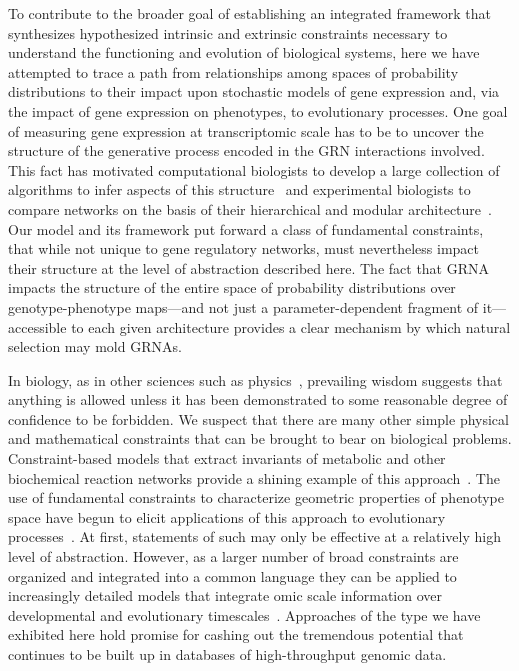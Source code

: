 To contribute to the broader goal of establishing an integrated framework that synthesizes hypothesized intrinsic and extrinsic constraints necessary to understand the functioning and evolution of biological systems, here we have attempted to trace a path from relationships among spaces of probability distributions to their impact upon stochastic models of gene expression and, via the impact of gene expression on phenotypes, to evolutionary processes. One goal of measuring gene expression at transcriptomic scale has to be to uncover the structure of the generative process encoded in the GRN interactions involved. This fact has motivated computational biologists to develop a large collection of algorithms to infer aspects of this structure~\cite{DeSmet2010} and experimental biologists to compare networks on the basis of their hierarchical and modular architecture~\cite{Ideker2012}. Our model and its framework put forward a class of fundamental constraints, that while not unique to gene regulatory networks, must nevertheless impact their structure at the level of abstraction described here. The fact that GRNA impacts the structure of the entire space of probability distributions over genotype-phenotype maps---and not just a parameter-dependent fragment of it---accessible to each given architecture provides a clear mechanism by which natural selection may mold GRNAs.

In biology, as in other sciences such as physics~\cite{Gell-Mann1956}, prevailing wisdom suggests that anything is allowed unless it has been demonstrated to some reasonable degree of confidence to be forbidden. We suspect that there are many other simple physical and mathematical constraints that can be brought to bear on biological problems. Constraint-based models that extract invariants of metabolic and other biochemical reaction networks provide a shining example of this approach~\cite{Karp2012,Bordbar2014}. The use of fundamental constraints to characterize geometric properties of phenotype space have begun to elicit applications of this approach to evolutionary processes~\cite{Shoval2012,Sheftel2013,Jordan2013}. At first, statements of such may only be effective at a relatively high level of abstraction. However, as a larger number of broad constraints are organized and integrated into a common language they can be applied to increasingly detailed models that integrate omic scale information over developmental and evolutionary timescales~\cite{Gunawardena2013}. Approaches of the type we have exhibited here hold promise for cashing out the tremendous potential that continues to be built up in databases of high-throughput genomic data.

